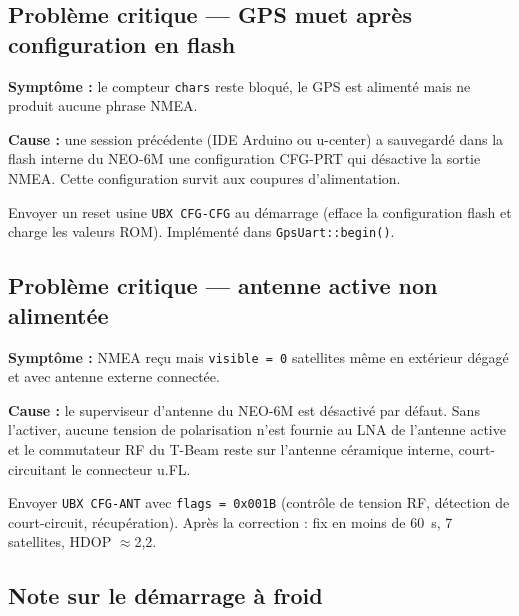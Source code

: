 \documentclass[12pt,a4paper]{article}
\newcommand{\file}[1]{\texttt{#1}}
\begin{document}
\subsection{Probl\`eme critique --- GPS muet apr\`es configuration en flash}

\begin{warningbox}
  \textbf{Sympt\^ome :} le compteur \texttt{chars} reste bloqu\'e, le GPS est
  aliment\'e mais ne produit aucune phrase NMEA.

  \textbf{Cause :} une session pr\'ec\'edente (IDE Arduino ou u-center) a sauvegard\'e
  dans la flash interne du NEO-6M une configuration CFG-PRT qui d\'esactive la sortie
  NMEA. Cette configuration survit aux coupures d'alimentation.
\end{warningbox}

\begin{okbox}
  Envoyer un reset usine \texttt{UBX CFG-CFG} au d\'emarrage (efface la configuration
  flash et charge les valeurs ROM). Impl\'ement\'e dans \file{GpsUart::begin()}.
\end{okbox}

\subsection{Probl\`eme critique --- antenne active non aliment\'ee}
\label{subsec:antena}

\begin{warningbox}
  \textbf{Sympt\^ome :} NMEA re\c{c}u mais \texttt{visible = 0} satellites m\^eme en
  ext\'erieur d\'egag\'e et avec antenne externe connect\'ee.

  \textbf{Cause :} le superviseur d'antenne du NEO-6M est d\'esactiv\'e par d\'efaut.
  Sans l'activer, aucune tension de polarisation n'est fournie au LNA de l'antenne
  active et le commutateur RF du T-Beam reste sur l'antenne c\'eramique interne,
  court-circuitant le connecteur u.FL.
\end{warningbox}

\begin{okbox}
  Envoyer \texttt{UBX CFG-ANT} avec \texttt{flags = 0x001B} (contr\^ole de tension RF,
  d\'etection de court-circuit, r\'ecup\'eration). Apr\`es la correction : fix en
  moins de 60~s, 7 satellites, HDOP $\approx$2,2.
\end{okbox}

\subsection{Note sur le d\'emarrage à froid}
\end{document}
